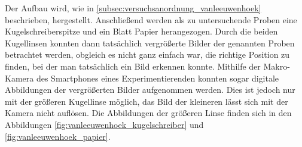 \documentclass[english, ngerman]{scrartcl}
\begin{document}
Der Aufbau wird, wie in \autoref{subsec:versuchsanordnung_vanleeuwenhoek} beschrieben, hergestellt. Anschließend werden als zu untersuchende Proben eine Kugelschreiberspitze und ein Blatt Papier herangezogen. Durch die beiden Kugellinsen konnten dann tatsächlich vergrößerte Bilder der genannten Proben betrachtet werden, obgleich es nicht ganz einfach war, die richtige Position zu finden, bei der man tatsächlich ein Bild erkennen konnte. Mithilfe der Makro-Kamera des Smartphones eines Experimentierenden konnten sogar digitale Abbildungen der vergrößerten Bilder aufgenommen werden. Dies ist jedoch nur mit der größeren Kugellinse möglich, das Bild der kleineren lässt sich mit der Kamera nicht auflösen. Die Abbildungen der größeren Linse finden sich in den Abbildungen \ref{fig:vanleeuwenhoek_kugelschreiber} und \ref{fig:vanleeuwenhoek_papier}.
%
\setcapindent{0pt}
\end{document}
